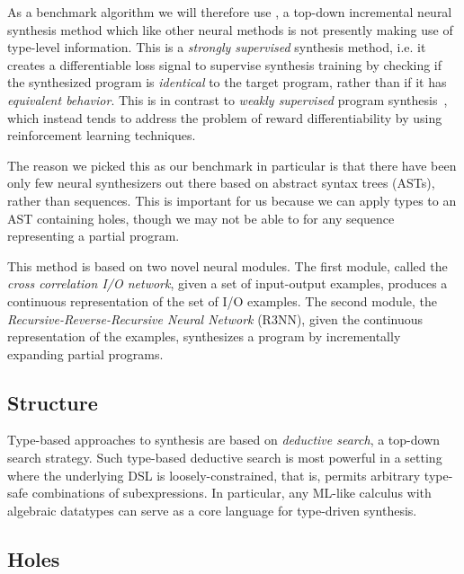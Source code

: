 \documentclass{article}
\begin{document}
As a benchmark algorithm we will therefore use \cite{nsps}, a top-down incremental neural synthesis method which like other neural methods is not presently making use of type-level information.
This is a \emph{strongly supervised} synthesis method, i.e. it creates a differentiable loss signal to supervise synthesis training by checking if the synthesized program is \emph{identical} to the target program, rather than if it has \emph{equivalent behavior}.
This is in contrast to \emph{weakly supervised} program synthesis~\citep{mapo}, which instead tends to address the problem of reward differentiability by using reinforcement learning techniques.

The reason we picked this as our benchmark in particular is that there have been only few neural synthesizers out there based on abstract syntax trees (ASTs), rather than sequences.
This is important for us because we can apply types to an AST containing holes, though we may not be able to for any sequence representing a partial program.

This method is based on two novel neural modules.
The first module, called the \emph{cross correlation I/O network}, given a set of input-output examples, produces a continuous representation of the set of I/O examples.
The second module, the \emph{Recursive-Reverse-Recursive Neural Network} (R3NN), given the continuous representation of the examples, synthesizes a program by incrementally expanding partial programs.~\citep{nsps}



\subsection{Structure}

Type-based approaches to synthesis are based on \emph{deductive search}, a top-down search strategy.
Such type-based deductive search is most powerful in a setting where the underlying DSL is loosely-constrained,
that is, permits arbitrary type-safe combinations of subexpressions.
In particular, any ML-like calculus with algebraic datatypes can serve as a core language for type-driven synthesis.~\citep{gulwani2017program}

\subsection{Holes}
\end{document}
